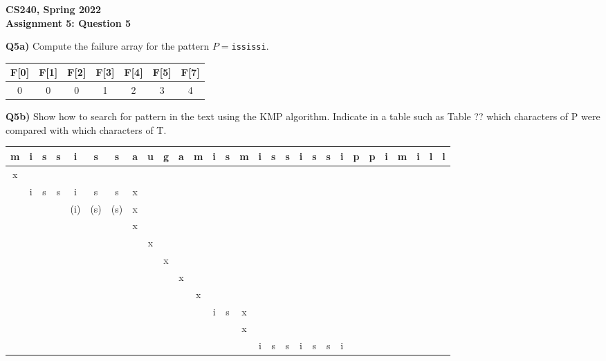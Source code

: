 \documentclass[12pt]{article}
\begin{document}
\begin{center}
{\Large\textbf{CS240, Spring 2022}}\\
\vspace{2mm}
{\Large\textbf{Assignment 5: Question 5}}\\
\vspace{3mm}
\end{center}

\begin{adjustwidth}{0em}{0pt}
\textbf{Q5a)} Compute the failure array for the pattern $P=$\texttt{ississi}.
\begin{center}
	\begin{tabular}{|c|c|c|c|c|c|c|} \hline
		F[0] & F[1] & F[2] & F[3] & F[4] & F[5] & F[7]  \\ \hline
		0 & 0 & 0  & 1  & 2 & 3 & 4   \\ \hline
	\end{tabular}
\end{center}
\textbf{Q5b)} Show how to search for pattern in the text using the KMP algorithm. Indicate in a table such as Table ?? which characters of P were compared with which characters of T.
\begin{center}
	\begin{tabular}{|c|c|c|c|c|c|c|c|c|c|c|c|c|c|c|c|c|c|c|c|c|c|c|c|c|c|c|c|c|}
	\hline		m&i&s&s&i&s&s&a&u&g&a&m&i&s&m&i&s&s&i&s&s&i&p&p&i&m&i&l&l\\
	\hline
	\hline
	x&&&&&&&&&&&&&&&&&&&&&&&&&&&&\\
	\hline
	&i&s&s&i&s&s&x&&&&&&&&&&&&&&&&&&&&&\\
	\hline
	&&&&(i)&(s)&(s)&x&&&&&&&&&&&&&&&&&&&&&\\
	\hline
	&&&&&&&x&&&&&&&&&&&&&&&&&&&&&\\
	\hline
	&&&&&&&&x&&&&&&&&&&&&&&&&&&&&\\
	\hline
	&&&&&&&&&x&&&&&&&&&&&&&&&&&&&\\
	\hline
	&&&&&&&&&&x&&&&&&&&&&&&&&&&&&\\
	\hline
	&&&&&&&&&&&x&&&&&&&&&&&&&&&&&\\
	\hline
	&&&&&&&&&&&&i&s&x&&&&&&&&&&&&&&\\
	\hline
	&&&&&&&&&&&&&&x&&&&&&&&&&&&&&\\
	\hline
	&&&&&&&&&&&&&&&i&s&s&i&s&s&i&&&&&&&\\
	\hline
	\end{tabular}
\end{center}
\end{adjustwidth} 
\newpage
\end{document}
